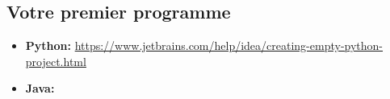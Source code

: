 \newpage

\subsection*{Votre premier programme}

\begin{itemize}
    \item \textbf{Python: }\url{https://www.jetbrains.com/help/idea/creating-empty-python-project.html}
    \item \textbf{Java: }
\end{itemize}


